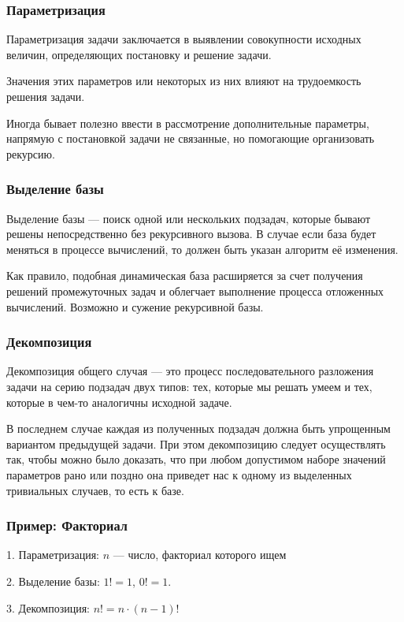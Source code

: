 		\begin{frame}
\frametitle{Параметризация}

Параметризация задачи заключается в выявлении совокупности исходных величин, определяющих постановку и решение задачи. 

Значения этих параметров или некоторых из них влияют на трудоемкость решения задачи. 

Иногда бывает полезно ввести в рассмотрение дополнительные параметры, напрямую с постановкой задачи не связанные, но помогающие организовать рекурсию.

\end{frame}

		\begin{frame}
\frametitle{Выделение базы}

Выделение базы --- поиск одной или нескольких подзадач, которые бывают решены непосредственно без рекурсивного вызова. В случае если база будет меняться в процессе вычислений, то должен быть указан алгоритм её изменения. 

Как правило, подобная динамическая база расширяется за счет получения решений промежуточных задач и облегчает выполнение процесса отложенных вычислений. Возможно и сужение рекурсивной базы.

\end{frame}

		\begin{frame}
\frametitle{Декомпозиция}

Декомпозиция общего случая --- это процесс последовательного разложения задачи на серию подзадач двух типов: тех, которые мы решать умеем и тех, которые в чем-то аналогичны исходной задаче. 

В последнем случае каждая из полученных подзадач должна быть упрощенным вариантом предыдущей задачи. При этом декомпозицию следует осуществлять так, чтобы можно было доказать, что при любом допустимом наборе значений параметров рано или поздно она приведет нас к одному из выделенных тривиальных случаев, то есть к базе.

\end{frame}

		\begin{frame}
\frametitle{Пример: Факториал}
1. Параметризация: $n$ --- число, факториал которого ищем

2. Выделение базы: $1!=1$, $0!=1$.

3. Декомпозиция: $n!=n\cdot(n-1)!$

\end{frame}